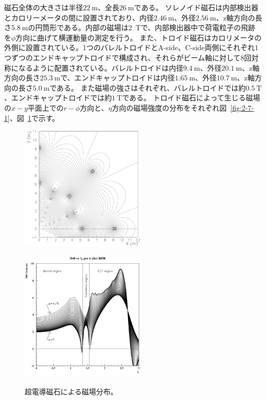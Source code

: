 磁石全体の大きさは半径$\SI{22}{\m}$、全長$\SI{26}{\m}$である。
ソレノイド磁石は内部検出器とカロリーメータの間に設置されており、内径$\SI{2.46}{\m}$、外径$\SI{2.56}{\m}$、z軸方向の長さ$\SI{5.8}{\m}$の円筒形である。内部の磁場は\SI{2}{\tesla}で、内部検出器中で荷電粒子の飛跡を$\phi$方向に曲げて横運動量の測定を行う。
また、トロイド磁石はカロリメータの外側に設置されている。1つのバレルトロイドとA-side、C-side両側にそれぞれ1つずつのエンドキャップトロイドで構成され、それらがビーム軸に対して8回対称になるように配置されている。バレルトロイドは内径$\SI{9.4}{\m}$、外径$\SI{20.1}{\m}$、z軸方向の長さ$\SI{25.3}{\m}$で、エンドキャップトロイドは内径$\SI{1.65}{\m}$、外径$\SI{10.7}{\m}$、z軸方向の長さ$\SI{5.0}{\m}$である。
また磁場の強さはそれぞれ、バレルトロイドでは約$\SI{0.5}{\tesla}$、エンドキャップトロイドでは約$\SI{1}{\tesla}$である。
トロイド磁石によって生じる磁場の$x-y$平面上での$r-\phi$方向と、$\eta$方向の磁場強度の分布をそれぞれ図~\ref{fig:2-7-1}、図~\ref{fig:2-7-2}で示す。

\begin{figure}[h]
  \begin{minipage}[b]{0.48\linewidth}
      \centering
      \includegraphics[clip, width=6cm]{fig/2/FMBmap.pdf}
      \label{fig:2-7-1}
  \end{minipage}
    \begin{minipage}[b]{0.48\linewidth}
      \centering
      \includegraphics[clip, width=6cm]{fig/2/bdl_cut.png}
      \label{fig:2-7-2}
  \end{minipage}
  \caption{超電導磁石による磁場分布\cite{article:ATLASMagneticField}。}
\end{figure}

